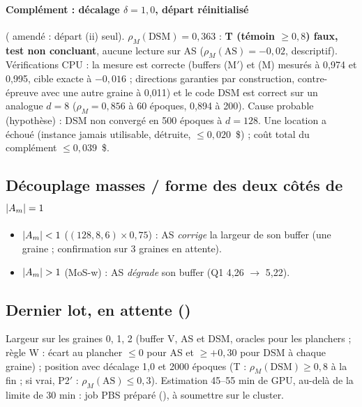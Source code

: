 \paragraph{Complément : décalage $\delta=1{,}0$, départ réinitialisé} ( amendé : départ (ii) seul). $\rho_M(\text{DSM})=0{,}363$ : \textbf{T (témoin $\ge0{,}8$) faux, test non concluant}, aucune lecture sur AS ($\rho_M(\text{AS})=-0{,}02$, descriptif). Vérifications CPU : la mesure est correcte (buffers (M$'$) et (M) mesurés à 0,974 et 0,995, cible exacte à $-0{,}016$ ; directions garanties par construction, contre-épreuve avec une autre graine à 0,011) et le code DSM est correct sur un analogue $d=8$ ($\rho_M=0{,}856$ à 60 époques, 0,894 à 200). Cause probable (hypothèse) : DSM non convergé en 500 époques à $d=128$. Une location a échoué (instance jamais utilisable, détruite, $\le0{,}020$~\$) ; coût total du complément $\le0{,}039$~\$.

\subsection{Découplage masses / forme des deux côtés de $|A_m|=1$}
\begin{itemize}
  \item $|A_m|<1$ ($(128,8,6)\times0{,}75$) : AS \emph{corrige} la largeur de son buffer (une graine ; confirmation sur 3 graines en attente).
  \item $|\Am|>1$ (MoS-w) : AS \emph{dégrade} son buffer (Q1 4,26 $\to$ 5,22).
\end{itemize}

\subsection{Dernier lot, en attente ()}
Largeur sur les graines 0, 1, 2 (buffer V, AS et DSM, oracles pour les planchers ; règle W : écart au plancher $\le0$ pour AS et $\ge+0{,}30$ pour DSM à chaque graine) ; position avec décalage 1,0 et 2000 époques (T : $\rho_M(\text{DSM})\ge0{,}8$ à la fin ; si vrai, P2$'$ : $\rho_M(\text{AS})\le0{,}3$). Estimation 45--55 min de GPU, au-delà de la limite de 30 min : job PBS préparé (), à soumettre sur le cluster.
